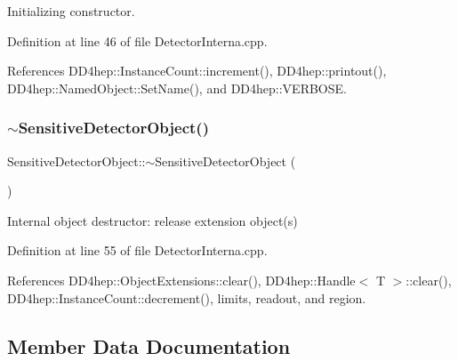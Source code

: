 Initializing constructor. 



Definition at line 46 of file Detector\+Interna.\+cpp.



References D\+D4hep\+::\+Instance\+Count\+::increment(), D\+D4hep\+::printout(), D\+D4hep\+::\+Named\+Object\+::\+Set\+Name(), and D\+D4hep\+::\+V\+E\+R\+B\+O\+SE.

\hypertarget{class_d_d4hep_1_1_geometry_1_1_sensitive_detector_object_a56ae1536039de98974a535cf6f2e66a1}{}\label{class_d_d4hep_1_1_geometry_1_1_sensitive_detector_object_a56ae1536039de98974a535cf6f2e66a1} 
\subsubsection{\texorpdfstring{$\sim$\+Sensitive\+Detector\+Object()}{~SensitiveDetectorObject()}}
{\footnotesize\ttfamily Sensitive\+Detector\+Object\+::$\sim$\+Sensitive\+Detector\+Object (\begin{DoxyParamCaption}{ }\end{DoxyParamCaption})\hspace{0.3cm}{\ttfamily [virtual]}}



Internal object destructor\+: release extension object(s) 



Definition at line 55 of file Detector\+Interna.\+cpp.



References D\+D4hep\+::\+Object\+Extensions\+::clear(), D\+D4hep\+::\+Handle$<$ T $>$\+::clear(), D\+D4hep\+::\+Instance\+Count\+::decrement(), limits, readout, and region.



\subsection{Member Data Documentation}
\hypertarget{class_d_d4hep_1_1_geometry_1_1_sensitive_detector_object_aec18ccc329468200900de0fabf900e76}{}\label{class_d_d4hep_1_1_geometry_1_1_sensitive_detector_object_aec18ccc329468200900de0fabf900e76} 
